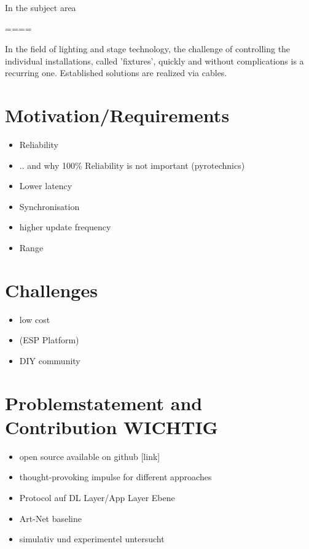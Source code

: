\documentclass[]{ccs-thesis}
\begin{document}
In the subject area 

====

In the field of lighting and stage technology, the challenge of controlling the individual installations, called 'fixtures', quickly and without complications is a recurring one. 
Established solutions are realized via cables.

\section{Motivation/Requirements}
\begin{itemize}
	\item Reliability
	\item .. and why 100\% Reliability is not important (pyrotechnics)
	\item Lower latency
	\item Synchronisation
	\item higher update frequency
	\item Range
\end{itemize}

\section{Challenges}
\begin{itemize}
\item low cost
\item (ESP Platform)
\item DIY community
\end{itemize}

\section{Problemstatement and Contribution WICHTIG}
\begin{itemize}
\item open source available on github [link]
\item thought-provoking impulse for different approaches
\item Protocol auf DL Layer/App Layer Ebene
\item Art-Net baseline
\item simulativ und experimentel untersucht
\end{itemize}
\end{document}
